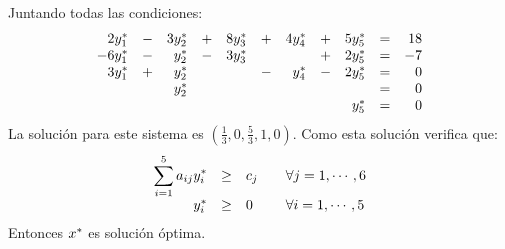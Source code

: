 \documentclass[10pt, aspectratio=169,usenames,dvipsnames]{beamer}
\begin{document}
\begin{frame}{}
    Juntando todas las condiciones:
    \[\begin{array}{rrrrrrrrrrr}
        2y^{\ast}_1 & - & 3y^{\ast}_2 & + & 8y^{\ast}_3 & + &4y^{\ast}_4& + &5y^{\ast}_5& = & 18\\
        -6y^{\ast}_1 & - & y^{\ast}_2 & - & 3y^{\ast}_3 & & & + &2y^{\ast}_5& = & -7\\
        3y^{\ast}_1 & + & y^{\ast}_2 &  &   & - & y^{\ast}_4 & - &2y^{\ast}_5& = & 0\\
         &  & y^{\ast}_2 &  &   &   & &   & & = & 0\\
         &  &  &  &  &  & &   & y^{\ast}_5& = & 0\\
    \end{array}
    \]
    La solución para este sistema es $(\frac{1}{3}, 0, \frac{5}{3}, 1, 0)$. Como esta solución verifica que:
        \[\begin{array}{rcll}
        \displaystyle\sum_{i=1}^5 a_{ij}y^{\ast}_i & \geq & c_j & \quad \forall j=1,\cdots,6  \\
        y^{\ast}_i & \geq & 0 & \quad \forall i=1,\cdots,5 
    \end{array}
    \]
    Entonces $x^{\ast}$ es solución óptima.
\end{frame}
\end{document}
